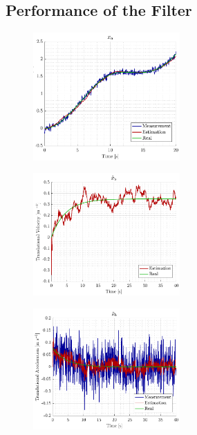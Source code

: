 \subsection{Performance of the Filter}



\begin{figure}[H]
    \includegraphics[width=0.5\textwidth]{figures/sim_xn}
    \caption{}
    \label{fig:sim_xn}
\end{figure}



\begin{figure}[H]
    \includegraphics[width=0.5\textwidth]{figures/sim_xbdot}
    \caption{}
    \label{fig:sim_xbdot}
\end{figure}


\begin{figure}[H]
    \includegraphics[width=0.5\textwidth]{figures/sim_xbddot}
    \caption{}
    \label{fig:sim_xbddot}
\end{figure}